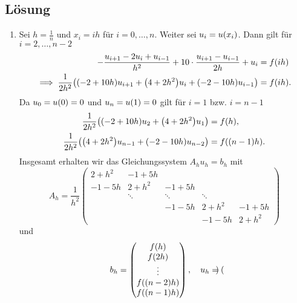 \documentclass{exercise}
\begin{document}
    \subsection*{Lösung}
    \begin{enumerate}
        \item Sei \(h = \frac{1}{n}\) und \(x_i = ih\) für \(i = 0, \ldots, n\).
        Weiter sei \(u_i = u\parentheses*{x_i}\).
        Dann gilt für \(i = 2, \ldots, n - 2\)
        \begin{align*}
            -\frac{u_{i + 1} - 2u_i + u_{i - 1}}{h^2} + 10 \cdot \frac{u_{i + 1} - u_{i - 1}}{2h} + u_i &= f\parentheses*{ih}\\
            \implies \frac{1}{2h^2}\parentheses*{\parentheses*{-2 + 10h}u_{i + 1} + \parentheses*{4 + 2h^2}u_i + \parentheses*{-2 - 10h}u_{i - 1}} &= f\parentheses*{ih}.
        \end{align*}
        Da \(u_0 = u\parentheses*{0} = 0\) und \(u_n = u\parentheses*{1} = 0\) gilt für \(i = 1\) bzw. \(i = n - 1\)
        \begin{align*}
            \frac{1}{2h^2}\parentheses*{\parentheses*{-2 + 10h}u_{2} + \parentheses*{4 + 2h^2}u_1} &= f\parentheses*{h},\\
            \frac{1}{2h^2}\parentheses*{\parentheses*{4 + 2h^2}u_{n - 1} + \parentheses*{-2 - 10h}u_{n - 2}} &= f\parentheses*{\parentheses*{n - 1}h}.
        \end{align*}
        Insgesamt erhalten wir das Gleichungssystem \(A_h u_h = b_h\) mit
        \[
            A_h = \frac{1}{h^2}\begin{pmatrix}
                2 + h^2 & -1 + 5h\\
                -1 - 5h & 2 + h^2 & -1 + 5h\\
                & \ddots & \ddots & \ddots\\
                & & -1 - 5h & 2 + h^2 & -1 + 5h\\
                & & & -1 - 5h & 2 + h^2
            \end{pmatrix}
        \]
        und
        \[
            b_h = \begin{pmatrix}
                f\parentheses*{h}\\
                f\parentheses*{2h}\\
                \vdots\\
                f\parentheses*{\parentheses*{n - 2}h}\\
                f\parentheses*{\parentheses*{n - 1}h}
            \end{pmatrix}, \quad u_h = \begin{pmatrix}

\end{pmatrix}\]
\end{enumerate}
\end{document}
